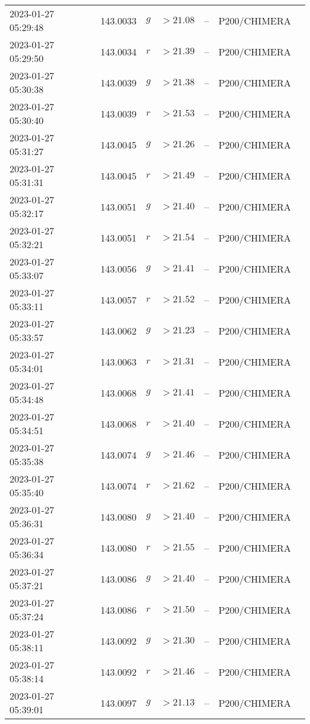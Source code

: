 \documentclass{nature_plusfigure}
\begin{document}
\begin{supplement}
\begin{center}
\begin{longtable}{lllllll}
2023-01-27 05:29:48 & 143.0033 & $g$ & $>21.08$ & -- & P200/CHIMERA &  \\ 
2023-01-27 05:29:50 & 143.0034 & $r$ & $>21.39$ & -- & P200/CHIMERA &  \\ 
2023-01-27 05:30:38 & 143.0039 & $g$ & $>21.38$ & -- & P200/CHIMERA &  \\ 
2023-01-27 05:30:40 & 143.0039 & $r$ & $>21.53$ & -- & P200/CHIMERA &  \\ 
2023-01-27 05:31:27 & 143.0045 & $g$ & $>21.26$ & -- & P200/CHIMERA &  \\ 
2023-01-27 05:31:31 & 143.0045 & $r$ & $>21.49$ & -- & P200/CHIMERA &  \\ 
2023-01-27 05:32:17 & 143.0051 & $g$ & $>21.40$ & -- & P200/CHIMERA &  \\ 
2023-01-27 05:32:21 & 143.0051 & $r$ & $>21.54$ & -- & P200/CHIMERA &  \\ 
2023-01-27 05:33:07 & 143.0056 & $g$ & $>21.41$ & -- & P200/CHIMERA &  \\ 
2023-01-27 05:33:11 & 143.0057 & $r$ & $>21.52$ & -- & P200/CHIMERA &  \\ 
2023-01-27 05:33:57 & 143.0062 & $g$ & $>21.23$ & -- & P200/CHIMERA &  \\ 
2023-01-27 05:34:01 & 143.0063 & $r$ & $>21.31$ & -- & P200/CHIMERA &  \\ 
2023-01-27 05:34:48 & 143.0068 & $g$ & $>21.41$ & -- & P200/CHIMERA &  \\ 
2023-01-27 05:34:51 & 143.0068 & $r$ & $>21.40$ & -- & P200/CHIMERA &  \\ 
2023-01-27 05:35:38 & 143.0074 & $g$ & $>21.46$ & -- & P200/CHIMERA &  \\ 
2023-01-27 05:35:40 & 143.0074 & $r$ & $>21.62$ & -- & P200/CHIMERA &  \\ 
2023-01-27 05:36:31 & 143.0080 & $g$ & $>21.40$ & -- & P200/CHIMERA &  \\ 
2023-01-27 05:36:34 & 143.0080 & $r$ & $>21.55$ & -- & P200/CHIMERA &  \\ 
2023-01-27 05:37:21 & 143.0086 & $g$ & $>21.40$ & -- & P200/CHIMERA &  \\ 
2023-01-27 05:37:24 & 143.0086 & $r$ & $>21.50$ & -- & P200/CHIMERA &  \\ 
2023-01-27 05:38:11 & 143.0092 & $g$ & $>21.30$ & -- & P200/CHIMERA &  \\ 
2023-01-27 05:38:14 & 143.0092 & $r$ & $>21.46$ & -- & P200/CHIMERA &  \\ 
2023-01-27 05:39:01 & 143.0097 & $g$ & $>21.13$ & -- & P200/CHIMERA &  \\ 

\end{longtable}
\end{center}
\end{supplement}
\end{document}

